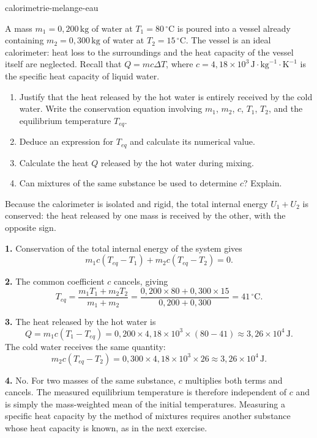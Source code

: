 \begin{exo}{calorimetrie-melange-eau}

A mass $m_1=0{,}200\,\text{kg}$ of water at $T_1=80\,^\circ\text{C}$ is poured into a vessel already containing $m_2=0{,}300\,\text{kg}$ of water at $T_2=15\,^\circ\text{C}$. The vessel is an ideal calorimeter: heat loss to the surroundings and the heat capacity of the vessel itself are neglected. Recall that $Q=mc\Delta T$, where $c=4{,}18\times10^3\,\text{J}\!\cdot\!\text{kg}^{-1}\!\cdot\!\text{K}^{-1}$ is the specific heat capacity of liquid water.

\begin{enumerate}
  \item Justify that the heat released by the hot water is entirely received by the cold water. Write the conservation equation involving $m_1$, $m_2$, $c$, $T_1$, $T_2$, and the equilibrium temperature $T_{eq}$.
  \item Deduce an expression for $T_{eq}$ and calculate its numerical value.
  \item Calculate the heat $Q$ released by the hot water during mixing.
  \item Can mixtures of the same substance be used to determine $c$? Explain.
\end{enumerate}

\begin{indication}
Because the calorimeter is isolated and rigid, the total internal energy $U_1+U_2$ is conserved: the heat released by one mass is received by the other, with the opposite sign.
\end{indication}

\begin{solution}
\textbf{1.} Conservation of the total internal energy of the system gives
\[
m_1c(T_{eq}-T_1)+m_2c(T_{eq}-T_2)=0.
\]

\textbf{2.} The common coefficient $c$ cancels, giving
\[
T_{eq}=\frac{m_1T_1+m_2T_2}{m_1+m_2}
=\frac{0{,}200\times80+0{,}300\times15}{0{,}200+0{,}300}
=41\,^\circ\text{C}.
\]

\textbf{3.} The heat released by the hot water is
\[
Q=m_1c(T_1-T_{eq})
=0{,}200\times4{,}18\times10^3\times(80-41)
\approx3{,}26\times10^4\,\text{J}.
\]
The cold water receives the same quantity:
\[
m_2c(T_{eq}-T_2)
=0{,}300\times4{,}18\times10^3\times26
\approx3{,}26\times10^4\,\text{J}.
\]

\textbf{4.} No. For two masses of the same substance, $c$ multiplies both terms and cancels. The measured equilibrium temperature is therefore independent of $c$ and is simply the mass-weighted mean of the initial temperatures. Measuring a specific heat capacity by the method of mixtures requires another substance whose heat capacity is known, as in the next exercise.
\end{solution}
\end{exo}


